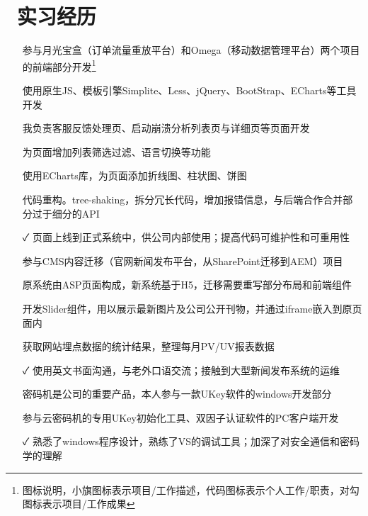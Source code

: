 \documentclass[14pt]{resume}
\begin{document}
\section{\faBriefcase\ 实习经历}
\begin{itemize}
    \item[\faFlagO] 参与月光宝盒（订单流量重放平台）和Omega（移动数据管理平台）两个项目的前端部分开发\footnote{图标说明，小旗图标表示项目/工作描述，代码图标表示个人工作/职责，对勾图标表示项目/工作成果}
    \item[\faFlagO] 使用原生JS、模板引擎Simplite、Less、jQuery、BootStrap、ECharts等工具开发
    \item[\faCode] 我负责客服反馈处理页、启动崩溃分析列表页与详细页等页面开发
    \item[\faCode] 为页面增加列表筛选过滤、语言切换等功能
    \item[\faCode] 使用ECharts库，为页面添加折线图、柱状图、饼图
    \item[\faCode] 代码重构。tree-shaking，拆分冗长代码，增加报错信息，与后端合作合并部分过于细分的API
    \item[\faCheck] 页面上线到正式系统中，供公司内部使用；提高代码可维护性和可重用性
\end{itemize}

\begin{itemize}
    \item[\faFlagO] 参与CMS内容迁移（官网新闻发布平台，从SharePoint迁移到AEM）项目
    \item[\faFlagO] 原系统由ASP页面构成，新系统基于H5，迁移需要重写部分布局和前端组件
    \item[\faCode] 开发Slider组件，用以展示最新图片及公司公开刊物，并通过iframe嵌入到原页面内
    \item[\faCode] 获取网站埋点数据的统计结果，整理每月PV/UV报表数据
    \item[\faCheck] 使用英文书面沟通，与老外口语交流；接触到大型新闻发布系统的运维
\end{itemize}

\begin{itemize}
    \item[\faFlagO] 密码机是公司的重要产品，本人参与一款UKey软件的windows开发部分
    \item[\faCode] 参与云密码机的专用UKey初始化工具、双因子认证软件的PC客户端开发
    \item[\faCheck] 熟悉了windows程序设计，熟练了VS的调试工具；加深了对安全通信和密码学的理解
\end{itemize}
\end{document}
